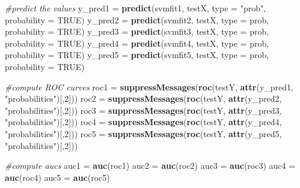 \documentclass[
]{article}
\newenvironment{Shaded}{\begin{snugshade}}{\end{snugshade}}
\newcommand{\AttributeTok}[1]{\textcolor[rgb]{0.13,0.29,0.53}{#1}}
\newcommand{\CommentTok}[1]{\textcolor[rgb]{0.56,0.35,0.01}{\textit{#1}}}
\newcommand{\ConstantTok}[1]{\textcolor[rgb]{0.56,0.35,0.01}{#1}}
\newcommand{\DecValTok}[1]{\textcolor[rgb]{0.00,0.00,0.81}{#1}}
\newcommand{\FunctionTok}[1]{\textcolor[rgb]{0.13,0.29,0.53}{\textbf{#1}}}
\newcommand{\NormalTok}[1]{#1}
\newcommand{\OtherTok}[1]{\textcolor[rgb]{0.56,0.35,0.01}{#1}}
\newcommand{\StringTok}[1]{\textcolor[rgb]{0.31,0.60,0.02}{#1}}
\begin{document}
\begin{Shaded}
\begin{Highlighting}[]
\CommentTok{\#predict the values}
\NormalTok{y\_pred1 }\OtherTok{=} \FunctionTok{predict}\NormalTok{(svmfit1, testX, }\AttributeTok{type =} \StringTok{"prob"}\NormalTok{, }\AttributeTok{probability =} \ConstantTok{TRUE}\NormalTok{)}
\NormalTok{y\_pred2 }\OtherTok{=} \FunctionTok{predict}\NormalTok{(svmfit2, testX, }\AttributeTok{type =} \StringTok{\textquotesingle{}prob\textquotesingle{}}\NormalTok{, }\AttributeTok{probability =} \ConstantTok{TRUE}\NormalTok{)}
\NormalTok{y\_pred3 }\OtherTok{=} \FunctionTok{predict}\NormalTok{(svmfit3, testX, }\AttributeTok{type =} \StringTok{\textquotesingle{}prob\textquotesingle{}}\NormalTok{, }\AttributeTok{probability =} \ConstantTok{TRUE}\NormalTok{)}
\NormalTok{y\_pred4 }\OtherTok{=} \FunctionTok{predict}\NormalTok{(svmfit4, testX, }\AttributeTok{type =} \StringTok{\textquotesingle{}prob\textquotesingle{}}\NormalTok{, }\AttributeTok{probability =} \ConstantTok{TRUE}\NormalTok{)}
\NormalTok{y\_pred5 }\OtherTok{=} \FunctionTok{predict}\NormalTok{(svmfit5, testX, }\AttributeTok{type =} \StringTok{\textquotesingle{}prob\textquotesingle{}}\NormalTok{, }\AttributeTok{probability =} \ConstantTok{TRUE}\NormalTok{)}

\CommentTok{\#compute ROC curves}
\NormalTok{roc1 }\OtherTok{=} \FunctionTok{suppressMessages}\NormalTok{(}\FunctionTok{roc}\NormalTok{(testY, }\FunctionTok{attr}\NormalTok{(y\_pred1, }\StringTok{"probabilities"}\NormalTok{)[,}\DecValTok{2}\NormalTok{]))}
\NormalTok{roc2 }\OtherTok{=} \FunctionTok{suppressMessages}\NormalTok{(}\FunctionTok{roc}\NormalTok{(testY, }\FunctionTok{attr}\NormalTok{(y\_pred2, }\StringTok{"probabilities"}\NormalTok{)[,}\DecValTok{2}\NormalTok{]))}
\NormalTok{roc3 }\OtherTok{=} \FunctionTok{suppressMessages}\NormalTok{(}\FunctionTok{roc}\NormalTok{(testY, }\FunctionTok{attr}\NormalTok{(y\_pred3, }\StringTok{"probabilities"}\NormalTok{)[,}\DecValTok{2}\NormalTok{]))}
\NormalTok{roc4 }\OtherTok{=} \FunctionTok{suppressMessages}\NormalTok{(}\FunctionTok{roc}\NormalTok{(testY, }\FunctionTok{attr}\NormalTok{(y\_pred4, }\StringTok{"probabilities"}\NormalTok{)[,}\DecValTok{2}\NormalTok{]))}
\NormalTok{roc5 }\OtherTok{=} \FunctionTok{suppressMessages}\NormalTok{(}\FunctionTok{roc}\NormalTok{(testY, }\FunctionTok{attr}\NormalTok{(y\_pred5, }\StringTok{"probabilities"}\NormalTok{)[,}\DecValTok{2}\NormalTok{]))}

\CommentTok{\#compute aucs}
\NormalTok{auc1 }\OtherTok{=} \FunctionTok{auc}\NormalTok{(roc1)}
\NormalTok{auc2 }\OtherTok{=} \FunctionTok{auc}\NormalTok{(roc2)}
\NormalTok{auc3 }\OtherTok{=} \FunctionTok{auc}\NormalTok{(roc3)}
\NormalTok{auc4 }\OtherTok{=} \FunctionTok{auc}\NormalTok{(roc4)}
\NormalTok{auc5 }\OtherTok{=} \FunctionTok{auc}\NormalTok{(roc5)}


\end{Highlighting}
\end{Shaded}
\end{document}
